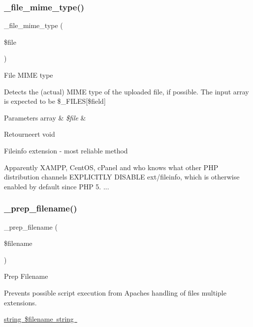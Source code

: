 \subsubsection{\texorpdfstring{\_file\_mime\_type()}{\_file\_mime\_type()}}
{\footnotesize\ttfamily \+\_\+file\+\_\+mime\+\_\+type (\begin{DoxyParamCaption}\item[{}]{\$file }\end{DoxyParamCaption})\hspace{0.3cm}{\ttfamily [protected]}}

File M\+I\+ME type

Detects the (actual) M\+I\+ME type of the uploaded file, if possible. The input array is expected to be \$\+\_\+\+F\+I\+L\+ES\mbox{[}\$field\mbox{]}


\begin{DoxyParams}[1]{Parameters}
array & {\em \$file} & \\
\hline
\end{DoxyParams}
\begin{DoxyReturn}{Retourneert}
void 
\end{DoxyReturn}
Fileinfo extension -\/ most reliable method

Apparently X\+A\+M\+PP, Cent\+OS, c\+Panel and who knows what other P\+HP distribution channels E\+X\+P\+L\+I\+C\+I\+T\+LY D\+I\+S\+A\+B\+LE ext/fileinfo, which is otherwise enabled by default since P\+HP 5. ...\mbox{\label{class_c_i___upload_a00936ce870d818794909bf16dc2ff70b}} 
\subsubsection{\texorpdfstring{\_prep\_filename()}{\_prep\_filename()}}
{\footnotesize\ttfamily \+\_\+prep\+\_\+filename (\begin{DoxyParamCaption}\item[{}]{\$filename }\end{DoxyParamCaption})\hspace{0.3cm}{\ttfamily [protected]}}

Prep Filename

Prevents possible script execution from Apache\textquotesingle{}s handling of files\textquotesingle{} multiple extensions.

\mbox{\hyperlink{}{string \$filename  string }}\mbox{\label{class_c_i___upload_afe56c7645362202d2f1c7b8f7da67f39}} 
